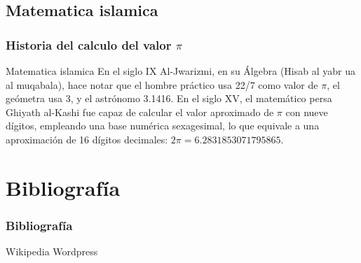 \documentclass{beamer}
\begin{document}
\subsection{Matematica islamica}
\begin{frame}
\frametitle{Historia del calculo del valor $\pi$}
\begin{block}{Matematica islamica}
En el siglo IX Al-Jwarizmi, en su Álgebra (Hisab al yabr ua al muqabala), hace notar que el hombre práctico usa 22/7 como valor de $\pi$, el geómetra usa 3, y el astrónomo 3.1416. En el siglo XV, el matemático persa Ghiyath al-Kashi fue capaz de calcular el valor aproximado de $\pi$ con nueve dígitos, empleando una base numérica sexagesimal, lo que equivale a una aproximación de 16 dígitos decimales: $2\pi = 6.2831853071795865$.
\end{block}
\end{frame}

\section{Bibliografía}
\begin{frame}
\frametitle{Bibliografía}
\begin{thebibliography}{99}


Wikipedia
Wordpress

\end{thebibliography}
\end{frame}
\end{document}
